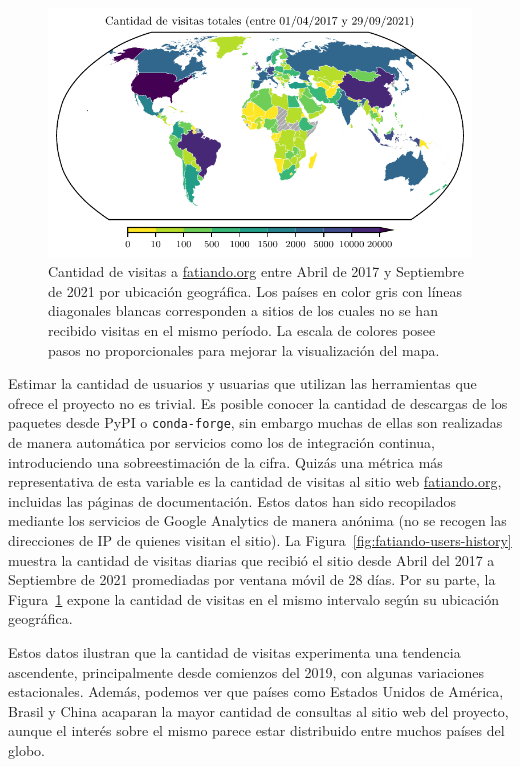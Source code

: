 \begin{figure}[t]
    \centering
    \includegraphics[width=\linewidth]{figs/fatiando/users_map.pdf}
    \caption{
        Cantidad de visitas a \href{https://fatiando.org}{fatiando.org} entre
        Abril de 2017 y Septiembre de 2021 por ubicación geográfica.
        Los países en color gris con líneas diagonales blancas corresponden
        a sitios de los cuales no se han recibido visitas en el mismo período.
        La escala de colores posee pasos no proporcionales para mejorar la
        visualización del mapa.
    }
    \label{fig:fatiando-users-map}
\end{figure}

Estimar la cantidad de usuarios y usuarias que utilizan las herramientas que
ofrece el proyecto no es trivial.
Es posible conocer la cantidad de descargas de los paquetes desde PyPI
o \texttt{conda-forge}, sin embargo muchas de ellas son realizadas de manera
automática por servicios como los de integración continua, introduciendo una
sobreestimación de la cifra.
Quizás una métrica más representativa de esta variable es la cantidad de
visitas al sitio web \href{https://fatiando.org}{fatiando.org}, incluidas las
páginas de documentación.
Estos datos han sido recopilados mediante los servicios de Google Analytics de
manera anónima (no se recogen las direcciones de IP de quienes visitan el
sitio).
La Figura~\ref{fig:fatiando-users-history} muestra la cantidad de visitas
diarias que recibió el sitio desde Abril del 2017 a Septiembre de 2021
promediadas por ventana móvil de
28 días.
Por su parte, la Figura~\ref{fig:fatiando-users-map} expone la cantidad de
visitas en el mismo intervalo según su ubicación geográfica.

Estos datos ilustran que la cantidad de visitas experimenta una tendencia
ascendente, principalmente desde comienzos del 2019, con algunas variaciones
estacionales.
Además, podemos ver que países como Estados Unidos de América, Brasil y China
acaparan la mayor cantidad de consultas al sitio web del proyecto,
aunque el interés sobre el mismo parece estar distribuido entre muchos
países del globo.

